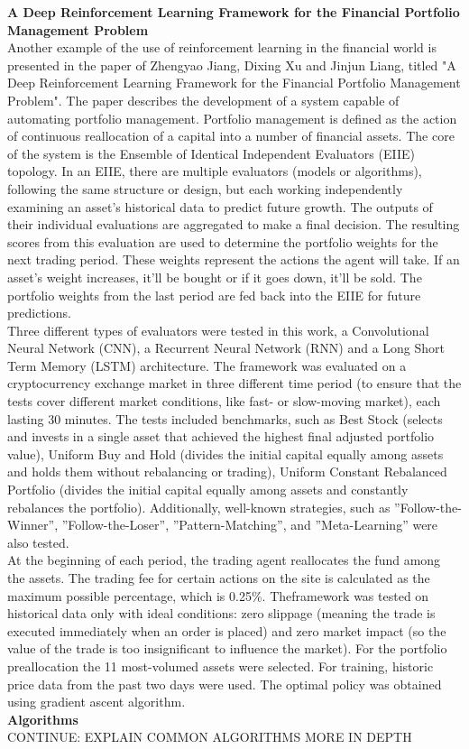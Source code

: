 \documentclass[a4paper,oneside,onecolumn,12pt]{LegrandOrangeBook}
\begin{document}
			\textbf{A Deep Reinforcement Learning Framework for the
			Financial Portfolio Management Problem} \cite{ADRLFFPMP}\\
			Another example of the use of reinforcement learning in the financial world is presented in the paper of Zhengyao Jiang, Dixing Xu and Jinjun Liang, titled "A Deep Reinforcement Learning Framework for the
			Financial Portfolio Management Problem". The paper describes the development of a system capable of automating portfolio management. Portfolio management is defined as the action of continuous reallocation of a capital into a number of financial assets. The core of the system is the Ensemble of Identical Independent Evaluators (EIIE) topology.  In an EIIE, there are multiple evaluators (models or algorithms), following the same structure or design, but each working independently examining an asset's historical data to predict future growth. The outputs of their individual evaluations are aggregated to make a final decision. The resulting scores from this evaluation are used to determine the portfolio weights for the next trading period. These weights represent the actions the agent will take. If an asset's weight increases, it'll be bought or if it goes down, it'll be sold. The portfolio weights from the last period are fed back into the EIIE for future predictions.\\
			Three different types of evaluators were tested in this work, a Convolutional Neural Network (CNN), a Recurrent Neural Network (RNN) and a Long Short Term Memory (LSTM) architecture. The framework was evaluated on a cryptocurrency exchange market in three different time period (to ensure that the tests cover different market conditions, like fast- or slow-moving market), each lasting 30 minutes. The tests included benchmarks, such as Best Stock (selects and invests in a single asset that achieved the highest final adjusted portfolio value), Uniform Buy and Hold (divides the initial capital equally among assets and holds them without rebalancing or trading), Uniform Constant
			Rebalanced Portfolio (divides the initial capital equally among assets and constantly rebalances the portfolio). Additionally, well-known strategies, such as ”Follow-the-Winner”, ”Follow-the-Loser”, ”Pattern-Matching”, and ”Meta-Learning” were also tested.\\
			At the beginning of each period, the trading agent reallocates the fund among the assets. The trading fee for certain actions on the site is calculated as the maximum possible percentage, which is 0.25\%. Theframework was tested on historical data only with ideal conditions: zero slippage (meaning the trade is executed immediately when an order is placed) and zero market impact (so the value of the trade is too insignificant to influence the market). For the portfolio preallocation the 11 most-volumed assets were selected. For training, historic price data from the past two days were used. The optimal policy was obtained using gradient ascent algorithm.\\
			\textbf{Algorithms}\\
			CONTINUE: EXPLAIN COMMON ALGORITHMS MORE IN DEPTH\\
\end{document}
